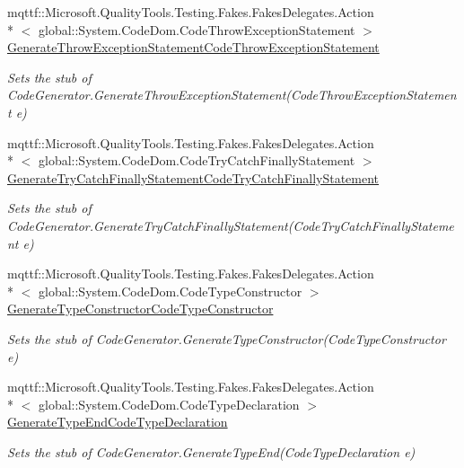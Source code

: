 \begin{DoxyCompactItemize}
mqttf\-::\-Microsoft.\-Quality\-Tools.\-Testing.\-Fakes.\-Fakes\-Delegates.\-Action\\*
$<$ global\-::\-System.\-Code\-Dom.\-Code\-Throw\-Exception\-Statement $>$ \hyperlink{class_system_1_1_code_dom_1_1_compiler_1_1_fakes_1_1_stub_code_generator_aed1e874894126aea98885986eab06020}{Generate\-Throw\-Exception\-Statement\-Code\-Throw\-Exception\-Statement}
\begin{DoxyCompactList}\small\item\em Sets the stub of Code\-Generator.\-Generate\-Throw\-Exception\-Statement(\-Code\-Throw\-Exception\-Statement e)\end{DoxyCompactList}\item 
mqttf\-::\-Microsoft.\-Quality\-Tools.\-Testing.\-Fakes.\-Fakes\-Delegates.\-Action\\*
$<$ global\-::\-System.\-Code\-Dom.\-Code\-Try\-Catch\-Finally\-Statement $>$ \hyperlink{class_system_1_1_code_dom_1_1_compiler_1_1_fakes_1_1_stub_code_generator_a7af7613c2f04b93ae5516c132ba0b2dd}{Generate\-Try\-Catch\-Finally\-Statement\-Code\-Try\-Catch\-Finally\-Statement}
\begin{DoxyCompactList}\small\item\em Sets the stub of Code\-Generator.\-Generate\-Try\-Catch\-Finally\-Statement(\-Code\-Try\-Catch\-Finally\-Statement e)\end{DoxyCompactList}\item 
mqttf\-::\-Microsoft.\-Quality\-Tools.\-Testing.\-Fakes.\-Fakes\-Delegates.\-Action\\*
$<$ global\-::\-System.\-Code\-Dom.\-Code\-Type\-Constructor $>$ \hyperlink{class_system_1_1_code_dom_1_1_compiler_1_1_fakes_1_1_stub_code_generator_a56afb5d726d0d976a47a78705684904e}{Generate\-Type\-Constructor\-Code\-Type\-Constructor}
\begin{DoxyCompactList}\small\item\em Sets the stub of Code\-Generator.\-Generate\-Type\-Constructor(\-Code\-Type\-Constructor e)\end{DoxyCompactList}\item 
mqttf\-::\-Microsoft.\-Quality\-Tools.\-Testing.\-Fakes.\-Fakes\-Delegates.\-Action\\*
$<$ global\-::\-System.\-Code\-Dom.\-Code\-Type\-Declaration $>$ \hyperlink{class_system_1_1_code_dom_1_1_compiler_1_1_fakes_1_1_stub_code_generator_ab9807daf0561fe1b74325ac47eb9f339}{Generate\-Type\-End\-Code\-Type\-Declaration}
\begin{DoxyCompactList}\small\item\em Sets the stub of Code\-Generator.\-Generate\-Type\-End(\-Code\-Type\-Declaration e)\end{DoxyCompactList}\item 

\end{DoxyCompactItemize}
